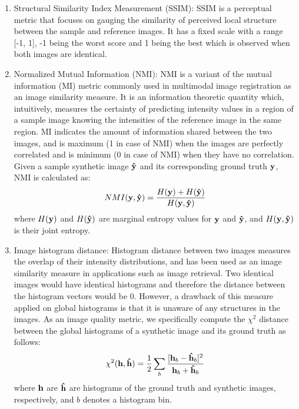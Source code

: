 \begin{enumerate}
    
    \item Structural Similarity Index Measurement (SSIM): SSIM \cite{wang2004image} is a perceptual metric that focuses on gauging the similarity of perceived local structure between the sample and reference images. It has a fixed scale with a range [-1, 1], -1 being the worst score and 1 being the best which is observed when both images are identical.
    
    \item Normalized Mutual Information (NMI): NMI \cite{studholme1999overlap} is a variant of the mutual information (MI) metric commonly used in multimodal image registration as an image similarity measure. It is an information theoretic quantity which, intuitively, measures the certainty of predicting intensity values in a region of a sample image knowing the intensities of the reference image in the same region. MI indicates the amount of information shared between the two images, and is maximum (1 in case of NMI) when the images are perfectly correlated and is minimum (0 in case of NMI) when they have no correlation. Given a sample synthetic image $\vb{\hat{y}}$ and its corresponding ground truth $\vb{y}$, NMI is calculated as: 
    \begin{equation}
        NMI(\vb{y}, \vb{\hat{y}}) = \frac{H(\vb{y}) + H(\vb{\hat{y}})}{H(\vb{y}, \vb{\hat{y}})}
        \label{eq:metric_nmi}
    \end{equation}
    where $H(\vb{y})$ and $H(\vb{\hat{y}})$ are marginal entropy values for $\vb{y}$  and $\vb{\hat{y}}$, and $H(\vb{y}, \vb{\hat{y}})$ is their joint entropy.
    
    \item Image histogram distance: Histogram distance between two images measures the overlap of their intensity distributions, and has been used as an image similarity measure in applications such as image retrieval. Two identical images would have identical histograms and therefore the distance between the histogram vectors would be 0. However, a drawback of this measure applied on global histograms is that it is unaware of any structures in the images. As an image quality metric, we specifically compute the $\chi^2$ distance between the global histograms of a synthetic image and its ground truth as follows: 
    \begin{equation}
        \chi^2(\vb{h}, \vb{\hat{h}}) = \frac{1}{2} \sum_{b} \frac{[\vb{h}_b - \vb{\hat{h}}_b]^2}{\vb{h}_b + \vb{\hat{h}}_b}
        \label{eq:metric_histogram}
    \end{equation}
    where $\vb{h}$ are $\vb{\hat{h}}$ are histograms of the ground truth and synthetic images, respectively, and $b$ denotes a histogram bin.
    
\end{enumerate}

